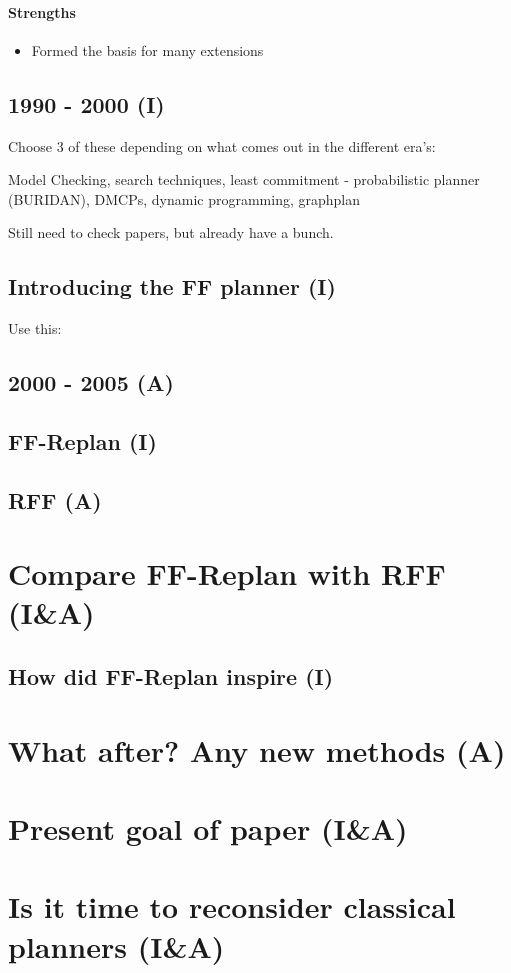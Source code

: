 \documentclass[runningheads,a4paper]{llncs}
\begin{document}
\paragraph{Strengths}

\begin{itemize}
	\item Formed the basis for many extensions

\end{itemize}

\subsection{1990 - 2000 (I)}
Choose 3 of these depending on what comes out in the different era's:

Model Checking, search techniques, least commitment - probabilistic planner (BURIDAN), DMCPs, dynamic programming, graphplan

Still need to check papers, but already have a bunch.


\subsection{Introducing the FF planner (I)}

Use this: \cite{Hoffmann01theff}

\subsection{2000 - 2005 (A)}

\subsection{FF-Replan (I)}

\subsection{RFF (A)}

\section{Compare FF-Replan with RFF (I\&A)}

\subsection{How did FF-Replan inspire (I)}

\section{What after? Any new methods (A)}

\section{Present goal of paper (I\&A)}

\section{Is it time to reconsider classical planners (I\&A)}



\end{document}
